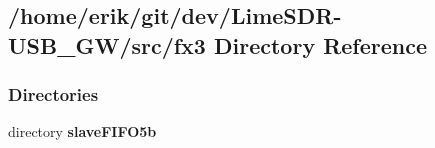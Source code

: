 \subsection{/home/erik/git/dev/\+Lime\+S\+D\+R-\/\+U\+S\+B\+\_\+\+G\+W/src/fx3 Directory Reference}
\label{dir_a5f2871b9e4522aab83fb171824f006f}
\subsubsection*{Directories}
\begin{DoxyCompactItemize}
\item 
directory {\bf slave\+F\+I\+F\+O5b}
\end{DoxyCompactItemize}
